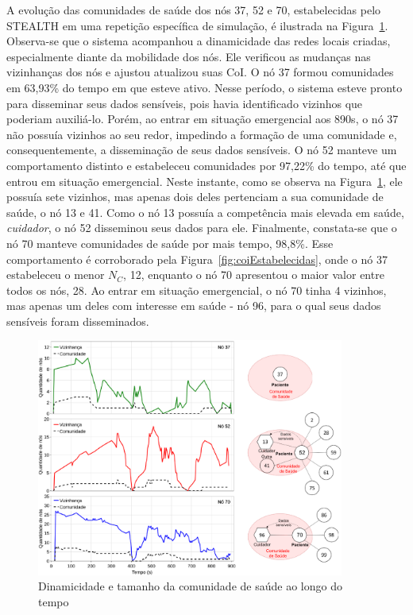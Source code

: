 \documentclass[12pt]{article}
\begin{document}
A
evolução
das comunidades de saúde dos nós 37, 52 e 70, estabelecidas pelo \mbox{STEALTH}
em uma repetição específica de simulação, é ilustrada na Figura~\ref{fig:neighs_x_cois}.
Observa-se
que o
sistema
acompanhou a dinamicidade das redes locais criadas, especialmente diante da mobilidade dos nós. Ele
verificou
as mudanças nas vizinhanças dos nós e
ajustou 
atualizou
suas
CoI.
O nó 37
formou
comunidades
em 63,93\% do tempo
em que esteve ativo.
Nesse período,
o sistema esteve pronto para disseminar seus dados sensíveis, pois havia identificado
vizinhos
que poderiam auxiliá-lo. Porém, ao entrar em situação emergencial aos 890s, o nó 37 não possuía vizinhos ao seu redor,
impedindo a formação de
uma comunidade e, consequentemente, a disseminação de seus dados sensíveis. O nó 52 manteve um comportamento distinto e estabeleceu comunidades por 97,22\% do tempo, até que entrou em situação emergencial. Neste instante, como se observa na Figura~\ref{fig:neighs_x_cois}, ele possuía sete vizinhos, mas apenas dois deles pertenciam a sua comunidade de saúde, o nó 13 e 41. Como o nó 13 possuía a competência mais elevada em saúde, \textit{cuidador}, o nó 52 disseminou seus dados para ele. Finalmente, constata-se que o nó 70 
manteve comunidades de saúde por mais tempo, 98,8\%. Esse comportamento é corroborado pela Figura~\ref{fig:coiEstabelecidas}, onde o nó 37 estabeleceu o menor $N_C$, 12, enquanto o nó 70 apresentou o maior valor entre todos os nós, 28. Ao entrar em situação emergencial, o nó 70 tinha 4 vizinhos, mas apenas um deles com interesse em saúde - nó 96, para o qual seus dados sensíveis foram disseminados. 

\begin{figure}[!htb]
\centering
\includegraphics[width=0.9\textwidth]{figures/neighs_cois_v2_890s_stack_3.pdf}
\vspace{-0.2cm}
\caption{Dinamicidade e tamanho da comunidade de saúde ao longo do tempo}
\label{fig:neighs_x_cois}
\end{figure}
\end{document}
